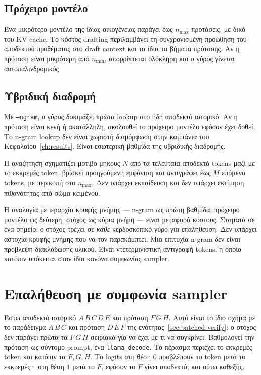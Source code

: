 \documentclass[a4paper,12pt]{report}
\theoremstyle{plain}
\theoremstyle{definition}
\theoremstyle{remark}
\begin{document}
\subsection{Πρόχειρο μοντέλο}

Ένα μικρότερο μοντέλο της ίδιας οικογένειας παράγει έως \(n_{\max}\)
προτάσεις, με δικό του KV cache. Το κόστος drafting περιλαμβάνει τη
συγχρονισμένη προώθηση του αποδεκτού προθέματος στο draft context και τα
ίδια τα βήματα πρότασης. Αν η πρόταση είναι μικρότερη από \(n_{\min}\),
απορρίπτεται ολόκληρη και ο γύρος γίνεται αυτοπαλινδρομικός.

\subsection{Υβριδική διαδρομή}

Με \texttt{--ngram}, ο γύρος δοκιμάζει πρώτα lookup στο ήδη αποδεκτό ιστορικό.
Αν η πρόταση είναι κενή ή ακατάλληλη, ακολουθεί το πρόχειρο μοντέλο εφόσον
έχει δοθεί. Το n-gram lookup δεν είναι χωριστή διαμόρφωση στην καμπάνια του
Κεφαλαίου~\ref{ch:results}. Είναι εσωτερική βαθμίδα της υβριδικής διαδρομής.

Η αναζήτηση σχηματίζει μοτίβο μήκους \(N\) από τα τελευταία αποδεκτά tokens
μαζί με το εκκρεμές token, βρίσκει προηγούμενη εμφάνιση και αντιγράφει έως
\(M\) επόμενα tokens, με περικοπή στο \(n_{\max}\). Δεν υπάρχει εκπαίδευση
και δεν υπάρχει εκτίμηση πιθανότητας από σώμα κειμένου.

Η αναλογία με ιεραρχία κρυφής μνήμης — n-gram ως πρώτη βαθμίδα, πρόχειρο
μοντέλο ως δεύτερη, στόχος ως κύρια μνήμη — είναι μεταφορά κόστους. Σταματά σε
ένα σημείο: ο στόχος τρέχει σε \emph{κάθε} κερδοσκοπικό γύρο για επαλήθευση.
Δεν υπάρχει αστοχία κρυφής μνήμης που να τον παρακάμπτει. Μια επιτυχία n-gram
δεν είναι πρόβλεψη διακλάδωσης υλικού. Είναι ντετερμινιστική αντιγραφή tokens,
η οποία κατόπιν υπόκειται στον ίδιο κανόνα συμφωνίας sampler.

\section{Επαλήθευση με συμφωνία sampler}
\label{sec:verify}

Έστω αποδεκτό ιστορικό \(A\,B\,C\,D\,E\) και πρόταση \(F\,G\,H\). Αυτό είναι
το ίδιο σχήμα με το παράδειγμα \(A\,B\,C\) και πρόταση \(D\,E\,F\) της
ενότητας~\ref{sec:batched-verify}: ο στόχος δεν παράγει πρώτα τα \(F\,G\,H\)
σειριακά για να έχει με τι να συγκρίνει. Βαθμολογεί την πρόταση ως σύντομο
prompt, ένα \texttt{llama\_decode}. Το πέρασμα περιέχει το εκκρεμές token και
κατόπιν τα \(F,G,H\). Τα logits στη θέση \(0\) προβλέπουν το token μετά το
εκκρεμές· στη θέση \(1\) μετά το \(F\), εφόσον το \(F\) γίνει αποδεκτό, και
ούτω καθεξής.
\end{document}
